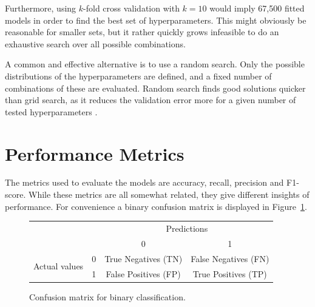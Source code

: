 Furthermore, using $k$-fold cross validation with $k=10$ would imply 67,500 fitted models in order to find the best set of hyperparameters. This might obviously be reasonable for smaller sets, but it rather quickly grows infeasible to do an exhaustive search over all possible combinations. 

A common and effective alternative is to use a random search. Only the possible distributions of the hyperparameters are defined, and a fixed number of combinations of these are evaluated. Random search finds good solutions quicker than grid search, as it reduces the validation error more for a given number of tested hyperparameters \citep{Goodfellow-et-al-2016}. 

\section{Performance Metrics}
The metrics used to evaluate the models are accuracy, recall, precision and F1-score. While these metrics are all somewhat related, they give different insights of performance. For convenience a binary confusion matrix is displayed in Figure~\ref{fig:confmat}. 

\begin{figure}[ht]
\centering
\begin{tabular}{cccc}
     & & \multicolumn{2}{c}{Predictions} \\
     & & \multicolumn{1}{|c|}{0} & \multicolumn{1}{c|}{1}\\
      \cline{2-4}
     \multirow{2}{*}{Actual values} & 0 & \multicolumn{1}{|c|}{True Negatives (TN)} &  \multicolumn{1}{c|}{False Negatives (FN)} \\
      & 1 & \multicolumn{1}{|c|}{False Positives (FP)} & \multicolumn{1}{c|}{True Positives (TP)} \\ 
     
\end{tabular}
\caption{Confusion matrix for binary classification.}
\label{fig:confmat}
\end{figure}

